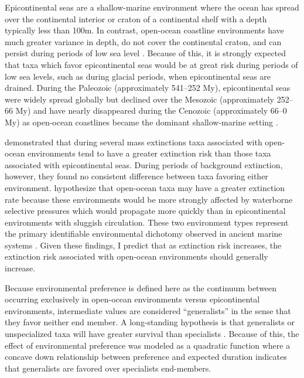 \documentclass{article}
\begin{document}
Epicontinental seas are a shallow-marine environment where the ocean has spread over the continental interior or craton of a continental shelf with a depth typically less than 100m. In contrast, open-ocean coastline environments have much greater variance in depth, do not cover the continental craton, and can persist during periods of low sea level \citep{Miller2009a}. Because of this, it is strongly expected that taxa which favor epicontinental seas would be at great risk during periods of low sea levels, such as during glacial periods, when epicontinental seas are drained. During the Paleozoic (approximately 541--252 My), epicontinental seas were widely spread globally but declined over the Mesozoic (approximately 252--66 My) and have nearly disappeared during the Cenozoic (approximately 66--0 My) as open-ocean coastlines became the dominant shallow-marine setting \citep{Peters2008,Miller2009a,Johnson1974}. 

\citet{Miller2009a} demonstrated that during several mass extinctions taxa associated with open-ocean environments tend to have a greater extinction risk than those taxa associated with epicontinental seas. During periods of background extinction, however, they found no consistent difference between taxa favoring either environment. \citet{Miller2009a} hypothesize that open-ocean taxa may have a greater extinction rate because these environments would be more strongly affected by waterborne selective pressures which would propagate more quickly than in epicontinental environments with sluggish circulation. These two environment types represent the primary identifiable environmental dichotomy observed in ancient marine systems \citep{Miller2009a,Peters2008,Sheehan2001b}. Given these findings, I predict that as extinction risk increases, the extinction risk associated with open-ocean environments should generally increase. 

Because environmental preference is defined here as the continuum between occurring exclusively in open-ocean environments versus epicontinental environments, intermediate values are considered ``generalists'' in the sense that they favor neither end member. A long-standing hypothesis is that generalists or unspecialized taxa will have greater survival than specialists \citep{Simpson1944,Liow2004a,Liow2007b,Nurnberg2013a,Nurnberg2015,Baumiller1993,Smits2015}. Because of this, the effect of environmental preference was modeled as a quadratic function where a concave down relationship between preference and expected duration indicates that generalists are favored over specialists end-members.
\end{document}

